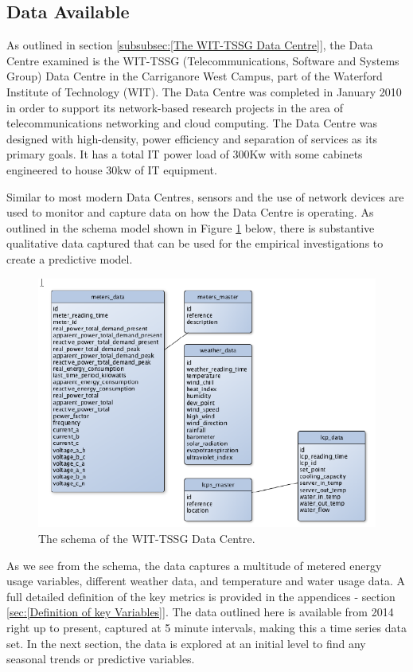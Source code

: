 \documentclass[12pt]{scrartcl}
\begin{document}
\subsection{Data Available}
\label{subsec:[Data Available]}
As outlined in section \ref{subsubsec:[The WIT-TSSG Data Centre]}, the Data Centre examined is the WIT-TSSG (Telecommunications, Software and Systems Group) Data Centre in the Carriganore West Campus, part of the Waterford Institute of Technology (WIT). The Data Centre was completed in January 2010 in order to support its network-based research projects in the area of telecommunications networking and cloud computing. The Data Centre was designed with high-density, power efficiency and separation of services as its primary goals. It has a total IT power load of 300Kw with some cabinets engineered to house 30kw of IT equipment.

Similar to most modern Data Centres, sensors and the use of network devices are used to monitor and capture data on how the Data Centre is operating. As outlined in the schema model shown in Figure \ref{fig:TSSGdataschema} below, there is substantive qualitative data captured that can be used for the empirical investigations to create a predictive model.  

\begin{figure}[h]
  \caption{The schema of the WIT-TSSG Data Centre.}
  \label{fig:TSSGdataschema}
  \centering
    \includegraphics[scale=0.45]{TSSG_Data_Schema}
\end{figure}

As we see from the schema, the data captures a multitude of metered energy usage variables, different weather data, and temperature and water usage data. A full detailed definition of the key metrics is provided in the appendices - section \ref{sec:[Definition of key Variables]}. The data outlined here is available from 2014 right up to present, captured at 5 minute intervals, making this a time series data set. In the next section, the data is explored at an initial level to find any seasonal trends or predictive variables. 
 
\end{document}
